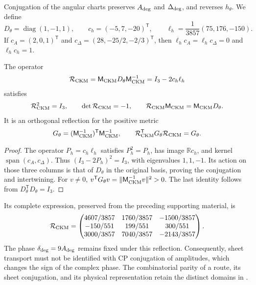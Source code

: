 Conjugation of the angular charts preserves \(A_{\rm deg}\) and
\(\Delta_{\rm deg}\), and reverses \(h_\theta\). We define
\begin{equation}
 D_\theta=\operatorname{diag}(1,-1,1),\qquad
 c_h=(-5,7,-20)^{\mathsf T},\qquad
 \ell_h=\frac1{3857}(75,176,-150).
 \label{eq:ii-ckm-sheet-data}
\end{equation}
If \(c_A=(2,0,1)^{\mathsf T}\) and
\(c_\Delta=(28,-25/2,-2/3)^{\mathsf T}\), then
\(\ell_hc_A=\ell_hc_\Delta=0\) and \(\ell_hc_h=1\).

\begin{theorem}
The operator
\begin{equation}
 \mathcal R_{\rm CKM}
 =\mathsf M_{\rm CKM}D_\theta\mathsf M_{\rm CKM}^{-1}
 =I_3-2c_h\ell_h
 \label{eq:ii-ckm-reflection}
\end{equation}
satisfies
\begin{equation}
 \mathcal R_{\rm CKM}^2=I_3,\qquad
 \det\mathcal R_{\rm CKM}=-1,\qquad
 \mathcal R_{\rm CKM}\mathsf M_{\rm CKM}
 =\mathsf M_{\rm CKM}D_\theta.
 \label{eq:ii-ckm-intertwining}
\end{equation}
It is an orthogonal reflection for the positive metric
\begin{equation}
 G_\theta=(\mathsf M_{\rm CKM}^{-1})^{\mathsf T}
                 \mathsf M_{\rm CKM}^{-1},\qquad
 \mathcal R_{\rm CKM}^{\mathsf T}G_\theta\mathcal R_{\rm CKM}=G_\theta.
 \label{eq:ii-ckm-metric}
\end{equation}
\end{theorem}

\begin{proof}
The operator \(P_h=c_h\ell_h\) satisfies \(P_h^2=P_h\), has image
\(\mathbb Rc_h\), and kernel \(\operatorname{span}(c_A,c_\Delta)\).
Thus \((I_3-2P_h)^2=I_3\), with eigenvalues \(1,1,-1\).
Its action on those three columns is that of \(D_\theta\) in the original
basis, proving the conjugation and intertwining.
For \(v\ne0\),
\(v^{\mathsf T}G_\theta v=\|\mathsf M_{\rm CKM}^{-1}v\|^2>0\).
The last identity follows from \(D_\theta^{\mathsf T}D_\theta=I_3\).
\end{proof}

Its complete expression, preserved from the preceding supporting material, is
\begin{equation}
 \mathcal R_{\rm CKM}=
 \begin{pmatrix}
 4607/3857&1760/3857&-1500/3857\\
 -150/551&199/551&300/551\\
 3000/3857&7040/3857&-2143/3857
 \end{pmatrix}.
 \label{eq:ii-ckm-reflection-matrix}
\end{equation}
The phase \(\delta_{\rm deg}=9A_{\rm deg}\) remains fixed under this
reflection. Consequently, sheet transport must not be identified
with CP conjugation of amplitudes, which changes the sign of the complex phase.
The combinatorial parity of a route, its sheet conjugation, and its
physical representation retain the distinct domains in
\cite{cpt,mezcla}.


